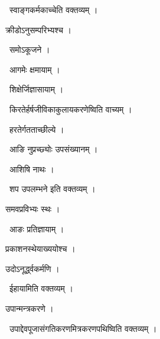 \documentclass[10pt, openany, oneside]{book}
\begin{document}
\par\noindent\hspace{1.5em}{\vps वा॰}~{\qt स्वाङ्गकर्मकाच्चेति वक्तव्यम् ।}

\noindent क्रीडोऽनुसम्परिभ्यश्च ।

\par\noindent\hspace{1.5em}{\vps वा॰}~{\qt समोऽकूजने ।}

\par\noindent\hspace{1.5em}{\vps वा॰}~{\qt आगमेः क्षमायाम् ।}

\par\noindent\hspace{1.5em}{\vps वा॰}~{\qt शिक्षेर्जिज्ञासायाम् ।}

\par\noindent\hspace{1.5em}{\vps वा॰}~{\qt किरतेर्हर्षजीविकाकुलायकरणेष्विति वाच्यम् ।}

\par\noindent\hspace{1.5em}{\vps वा॰}~{\qt हरतेर्गतताच्छील्ये ।}

\par\noindent\hspace{1.5em}{\vps वा॰}~{\qt आङि नुप्रच्छ्योः उपसंख्यानम् ।}

\par\noindent\hspace{1.5em}{\vps वा॰}~{\qt आशिषि नाथः ।}

\par\noindent\hspace{1.5em}{\vps वा॰}~{\qt शप उपलम्भने इति वक्तव्यम् ।}

\noindent समवप्रविभ्यः स्थः ।

\par\noindent\hspace{1.5em}{\vps वा॰}~{\qt आङः प्रतिज्ञायाम् ।}

\noindent प्रकाशनस्थेयाख्ययोश्च ।

\noindent उदोऽनूर्द्ध्वकर्मणि ।

\par\noindent\hspace{1.5em}{\vps वा॰}~{\qt ईहायामिति वक्तव्यम् ।}

\noindent उपान्मन्त्रकरणे ।

\par\noindent\hspace{1.5em}{\vps वा॰}~{\qt उपाद्देवपूजासंगतिकरणमित्रकरणपथिष्विति वक्तव्यम् ।}
\end{document}
